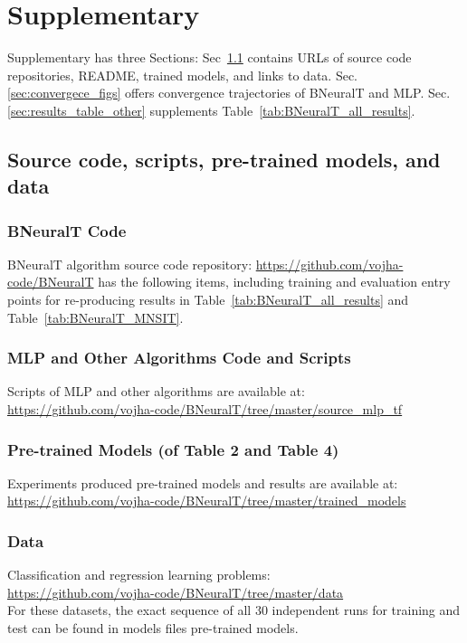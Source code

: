\documentclass[11pt,a4paper]{article}
\begin{document}
    
    \clearpage
    \appendix
    \normalsize
    
\renewcommand{\thetable}{\Alph{section}\arabic{table}}
    \renewcommand{\thefigure}{\Alph{section}\arabic{figure}}
    \setcounter{table}{0}
    \setcounter{figure}{0}
    
    \section{Supplementary}
    Supplementary has three Sections: Sec~\ref{sec:source_code} contains URLs of source code repositories, README, trained models, and links to data. Sec.\ref{sec:convergece_figs} offers convergence trajectories of BNeuralT and MLP. Sec.\ref{sec:results_table_other} supplements Table~\ref{tab:BNeuralT_all_results}. 
    
    
    \subsection{Source code, scripts, pre-trained models, and data}
    \label{sec:source_code}
    \subsubsection{BNeuralT Code}  
    BNeuralT algorithm source code repository:
    \url{https://github.com/vojha-code/BNeuralT}
    has the following items, including training and evaluation entry points for re-producing results in Table~\ref{tab:BNeuralT_all_results} and Table~\ref{tab:BNeuralT_MNSIT}.
    
    \subsubsection{MLP and Other Algorithms Code and Scripts} 
    Scripts of MLP and other algorithms are available at:\\
    \url{https://github.com/vojha-code/BNeuralT/tree/master/source_mlp_tf}
    
    \subsubsection{Pre-trained Models (of Table 2 and Table 4)}
    Experiments produced pre-trained models and results are available at:\\
    \url{https://github.com/vojha-code/BNeuralT/tree/master/trained_models}
    
    \subsubsection{Data} 
    Classification and regression learning problems:\\ \url{https://github.com/vojha-code/BNeuralT/tree/master/data}\\
    For these datasets, the exact sequence of all 30 independent runs for training and test can be found in models files pre-trained models.
    
\end{document}
